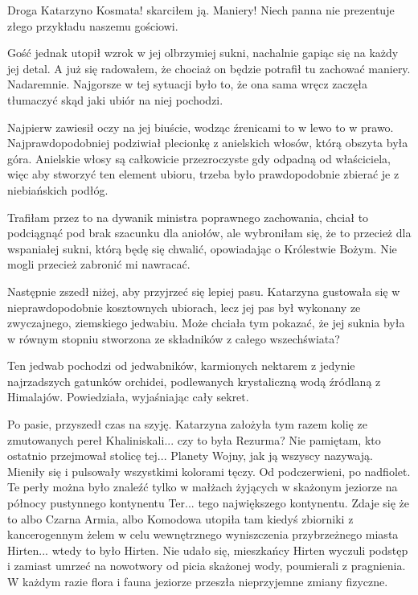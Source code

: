 \ds{} Droga Katarzyno Kosmata! \dm{} skarciłem ją. \dm{} Maniery! Niech panna nie prezentuje złego przykładu naszemu gościowi.\de{}

Gość jednak utopił wzrok w jej olbrzymiej sukni, nachalnie gapiąc się na każdy jej detal.
A już się radowałem, że chociaż on będzie potrafił tu zachować maniery. Nadaremnie.
Najgorsze w tej sytuacji było to, że ona sama wręcz zaczęła tłumaczyć skąd jaki ubiór na niej pochodzi.

Najpierw zawiesił oczy na jej biuście, wodząc źrenicami to w lewo to w prawo.
Najprawdopodobniej podziwiał plecionkę z anielskich włosów, którą obszyta była góra.
Anielskie włosy są całkowicie przezroczyste gdy odpadną od właściciela, więc
aby stworzyć ten element ubioru, trzeba było prawdopodobnie zbierać je z niebiańskich podłóg.

\ds{} Trafiłam przez to na dywanik ministra poprawnego zachowania, chciał to podciągnąć pod brak szacunku dla aniołów, ale wybroniłam się, że to przecież dla wspaniałej sukni, którą będę się chwalić, opowiadając o Królestwie Bożym. Nie mogli przecież zabronić mi nawracać. \de{}

Następnie zszedł niżej, aby przyjrzeć się lepiej pasu.
Katarzyna gustowała się w nieprawdopodobnie kosztownych ubiorach, lecz jej pas był wykonany ze zwyczajnego, ziemskiego jedwabiu.
Może chciała tym pokazać, że jej suknia była w równym stopniu stworzona ze składników z całego wszechświata?

\ds{} Ten jedwab pochodzi od jedwabników, karmionych nektarem z jedynie najrzadszych gatunków orchidei, podlewanych krystaliczną wodą źródlaną z Himalajów. 
\dm{} Powiedziała, wyjaśniając cały sekret. \de{}

Po pasie, przyszedł czas na szyję. Katarzyna założyła tym razem kolię ze zmutowanych pereł Khaliniskali...
czy to była Rezurma? Nie pamiętam, kto ostatnio przejmował stolicę tej... Planety Wojny, jak ją wszyscy nazywają.
Mieniły się i pulsowały wszystkimi kolorami tęczy. Od podczerwieni, po nadfiolet.
Te perły można było znaleźć tylko w małżach żyjących w skażonym jeziorze na północy pustynnego kontynentu Ter... tego największego kontynentu.
Zdaje się że to albo Czarna Armia, albo Komodowa utopiła tam kiedyś zbiorniki z kancerogennym żelem w celu wewnętrznego wyniszczenia przybrzeżnego miasta Hirten... wtedy to było Hirten.
Nie udało się, mieszkańcy Hirten wyczuli podstęp i zamiast umrzeć na nowotwory od picia skażonej wody, poumierali z pragnienia.
W każdym razie flora i fauna jeziorze przeszła nieprzyjemne zmiany fizyczne.

